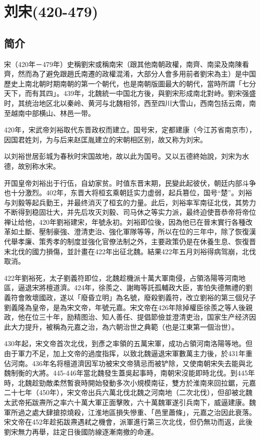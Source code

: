 

\section{刘宋\tiny(420-479)}

\subsection{简介}

宋（420年－479年）史稱劉宋或稱南宋（跟其他南朝政權，南齊、南梁及南陳看齊，然而為了避免跟趙氏南遷的政權混淆，大部分人會多用前者劉宋為主）是中国歷史上南北朝时期南朝的第一个朝代，也是南朝版圖最大的朝代，當時所謂「七分天下，而有其四」。439年，北魏統一中国北方後，與劉宋形成南北對峙。劉宋强盛时，其统治地区北以秦岭、黄河与北魏相邻，西至四川大雪山，西南包括云南，南至越南中部横山、林邑一带。

420年，宋武帝刘裕取代东晋政权而建立。国号宋，定都建康（今江苏省南京市），因国君姓刘，为与后来赵匡胤建立的宋朝相区别，故又称为刘宋。

以刘裕世居彭城为春秋时宋国故地，故以此为国号。又以五德終始說，刘宋为水德，故别称水宋。

开国皇帝刘裕出于行伍，自幼家贫。时值东晋末期，民變此起彼伏，朝廷内部斗争也十分激烈。402年，东晋大将桓玄乘朝廷实力虚弱，起兵篡位，国号“楚”。刘裕与刘毅等起兵勤王，并最终消灭了桓玄的力量。此后，刘裕率军南征北伐，其势力不断得到稳固壮大，并先后攻灭刘毅、司马休之等实力派，最终迫使晋恭帝将帝位禅让给他，420年劉裕建宋，年號永初。刘裕即位後，因為他已在晉末實行各種改革如土斷、壓制豪強、澄清吏治、強化軍隊等等，所以在位的三年中，除了恢復漢代舉孝廉、策秀孝的制度並強化官僚法制之外，主要政策仍是在休養生息、恢復晋末北伐的國力損傷，並計畫在422年出征北魏。結果422年五月刘裕得病驾崩，北伐取消。

422年劉裕死，太子劉義符即位，北魏趁機派十萬大軍南侵，占領洛陽等河南地區，逼退宋將檀道濟。424年，徐羨之、謝晦等託孤輔政大臣，害怕失德無禮的劉義符會敗壞國政，遂以「廢昏立明」為名號，廢殺劉義符，改立劉裕的第三個兒子劉義隆為皇帝，是為宋文帝，年號元嘉。宋文帝在426年除掉權臣徐羨之等人後親政，他在位三十年，励精图治、知人善任、提倡節儉並澄清吏治，国家生产经济因此大力提升，被稱為元嘉之治，為六朝治世之典範（也是江東第一個治世）。

430年起，宋文帝首次北伐，到彥之率領的五萬宋軍，成功占領河南洛陽等地。但由于軍力不足，加上文帝的過度指挥，以致北魏逼退宋軍數萬主力後，於431年重佔河南。436年名将檀道濟因军功被宋文帝猜忌而被铲除，又使南朝宋失去能與北魏制衡的大將。445-446年當北魏發生蓋吳起事時，南朝宋沒能即時北伐。到445年時，北魏趁勁敵柔然暫衰時開始發動多次小規模南征，雙方於淮南來回拉鋸，元嘉二十七年（450年），宋文帝出兵六萬北伐北魏之河南地（二次北伐），但卻被北魏太武帝拓跋燾所之率六十萬大軍正面擊敗，六十萬魏軍遂引兵南下，威逼建康。魏軍所過之處大肆搶掠燒殺，江淮地區損失慘重、「邑里蕭條」，元嘉之治因此衰落。宋文帝在452年趁拓跋燾遇弒之機會，派軍進行第三次北伐，但仍無功而返，此後劉宋無力再舉，註定日後國防線逐漸南撤的命運。

